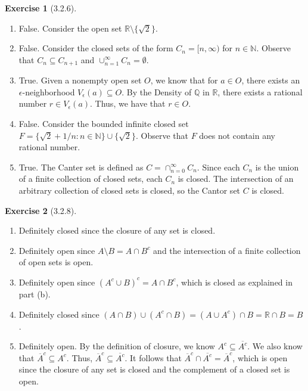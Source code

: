 \documentclass{amsart}
\theoremstyle{definition}
\newtheorem{exercise}{Exercise}
\newcommand{\N}{\mathbb{N}}
\newcommand{\Q}{\mathbb{Q}}
\newcommand{\R}{\mathbb{R}}
\newcommand{\st}{\mathrel{:}}
\begin{document}
\begin{exercise}[3.2.6]
  \begin{enumerate}[label={(\alph*)}]
    \item False. Consider the open set $\R \setminus \{\sqrt{2}\}$.
    \item False. Consider the closed sets of the form $C_n = \lbrack n, \infty
      \rparen$ for $n \in \N$. Observe that $C_n \subseteq C_{n+1}$ and
      $\cup_{n=1}^\infty C_n = \emptyset$.
    \item True. Given a nonempty open set $O$, we know that for $a \in O$, there
      exists an $\epsilon$-neighborhood $V_\epsilon(a) \subseteq O$. By the
      Density of $\Q$ in $\R$, there exists a rational number $r \in
      V_\epsilon(a)$. Thus, we have that $r \in O$.
    \item False. Consider the bounded infinite closed set $F = \{\sqrt{2} + 1/n
      \st n \in \N\} \cup \{\sqrt{2}\}$. Observe that $F$ does not contain any
      rational number.
    \item True. The Canter set is defined as $C = \cap_{n=0}^\infty C_n$. Since
      each $C_n$ is the union of a finite collection of closed sets, each $C_n$
      is closed. The intersection of an arbitrary collection of closed sets is
      closed, so the Cantor set $C$ is closed.
  \end{enumerate}
\end{exercise}

\begin{exercise}[3.2.8]
  \begin{enumerate}[label={(\alph*)}]
    \item Definitely closed since the closure of any set is closed.
    \item Definitely open since $A \setminus B = A \cap B^c$ and the
      intersection of a finite collection of open sets is open.
    \item Definitely open since ${(A^c \cup B)}^c = A \cap B^c$, which is closed
      as explained in part (b).
    \item Definitely closed since  $(A \cap B) \cup (A^c \cap B) = (A \cup A^c)
      \cap B = \R \cap B = B$.
    \item Definitely open. By the definition of closure, we know $A^c \subseteq
      \overline{A^c}$. We also know that $\overline{A}^c \subseteq A^c$. Thus,
      $\overline{A}^c \subseteq \overline{A^c}$. It follows that $\overline{A}^c
      \cap \overline{A^c} = \overline{A}^c$, which is open since the closure of
      any set is closed and the complement of a closed set is open.
  \end{enumerate}
\end{exercise}
\end{document}
